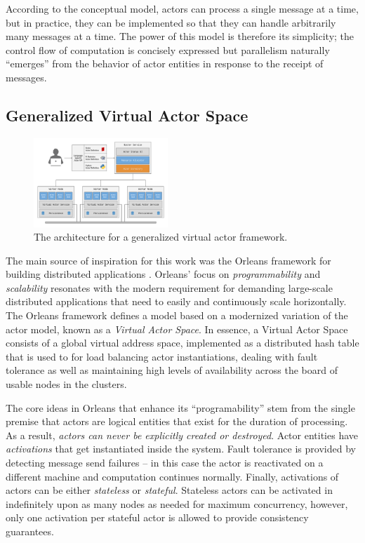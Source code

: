 \documentclass[conference,twocolumn,10pt]{IEEEtran}
\begin{document}
According to the conceptual model, actors can process a single message at a time, but in practice, they can be implemented so that they can handle arbitrarily many messages at a time. The power of this model is therefore its simplicity; the control flow of computation is concisely expressed but parallelism naturally ``emerges'' from the behavior of actor entities in response to the receipt of messages.

\subsection{Generalized Virtual Actor Space}

\begin{figure}[!t]
    \centering
    \includegraphics[width=0.45\textwidth]{architecture}
    \caption{The architecture for a generalized virtual actor framework.}
    \label{fig:architecture}
\end{figure}

The main source of inspiration for this work was the Orleans framework for building distributed applications \cite{bernstein_orleans:_2014}. Orleans' focus on \textit{programmability} and \textit{scalability} resonates with the modern requirement for demanding large-scale distributed applications that need to easily and continuously scale horizontally. The Orleans framework defines a model based on a modernized variation of the actor model, known as a \textit{Virtual Actor Space}. In essence, a Virtual Actor Space consists of a global virtual address space, implemented as a distributed hash table that is used to for load balancing actor instantiations, dealing with fault tolerance as well as maintaining high levels of availability across the board of usable nodes in the clusters.

The core ideas in Orleans that enhance its ``programability'' stem from the single premise that actors are logical entities that exist for the duration of processing. As a result, \textit{actors can never be explicitly created or destroyed}. Actor entities have \textit{activations} that get instantiated inside the system. Fault tolerance is provided by detecting message send failures -- in this case the actor is reactivated on a different machine and computation continues normally. Finally, activations of actors can be either \textit{stateless} or \textit{stateful}. Stateless actors can be activated in indefinitely upon as many nodes as needed for maximum concurrency, however, only one activation per stateful actor is allowed to provide consistency guarantees.
\end{document}
